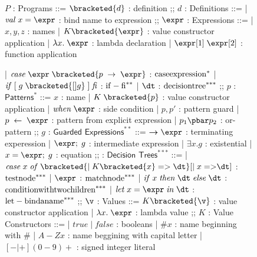\documentclass[manuscript,screen,review, 12pt]{acmart}
\begin{document}
\begin{figure}[h!p]
    \small
    \begin{flushleft}
        \begin{bnf}
        $P$ : \textsf{Programs} ::=
        $\bracketed{d}$ : definition
        ;;
        $d$ : \textsf{Definitions} ::=
        | $\mathit{val} \; x \; \mathit{=} \; \expr$ : bind name to expression
        ;;
        $\expr$ : Expressions ::= 
        | $x, y, z$              : names
        | $K\bracketed{\expr}$   : value constructor application 
        | $\lambda x. \; \expr$  : lambda declaration  
        | $\expr[1] \; \expr[2]$ : function application 
    
        | $\mathit{case} \; \expr \; \bracketed{p \; \rightarrow \; \expr}$ : $\rm{case expression}^{*}$
        | $\mathit{if} \; \mathit{[}\; g \; 
            \bracketed{[] g} \;\mathit{]} \; \mathit{fi}$                   : $\rm{if-fi}^{**}$
        | $\dt$ : $\rm{decision tree}^{***}$
            ;;
            $p$ : $\textsf{Patterns}^{*}$ ::= 
            $x$ : name 
            | $K \; \bracketed{p}$          : value constructor application 
            | $\mathit{when}\; \expr$       : side condition
            | $p, p'$                       : pattern guard 
            | $p \; \leftarrow \; \expr$    : pattern from explicit expression  
            | $p_{1}\pbar p_{2}$            : or-pattern
            ;;
            $g$ : $\textsf{Guarded Expressions}^{**}$ ::=  
            $\boldsymbol{\rightarrow}\expr$ : terminating experession
            | $\expr; \; g$                 : intermediate expression 
            | $\exists x \mathit{.} g$      : existential 
            | $x = \expr; \; g$             : equation 
            ;;
            \dt : $\textsf{Decision Trees}^{***}$ ::= 
            | $\mathit{case} \; x \; \mathit{of} \; 
                \bracketed{\vert \; K\bracketed{x} \; \mathit{=>} \; \dt} 
                [\vert \; x \; \mathit{=>} \dt]$                                 : $\rm{test node }^{***}$
            | $\expr$                                                           : $\rm{match node }^{***}$
            | $\mathit{if} \; x \; \mathit{then} \; \dt \; \mathit{else} \; \dt$  : $\rm{condition with two children }^{***}$
            | $\mathit{let} \; x \; \mathit{=} \; \expr \; \mathit{in} \; \dt$   : $\rm{let-bind a name}^{***}$
        ;;
        $\v$ : Values ::= 
          $K\bracketed{\v}$     : value constructor application 
        | $\lambda x. \; \expr$ : lambda value 
        ;;
        $K$ : \textsf{Value Constructors} ::=
        | $\mathit{true}\; \vert\; \mathit{false}$ : booleans
        | $\mathit{\#}x$                           : name beginning with $\mathit{\#}$
        | $\mathit{A-Z}x$                          : name beggining with capital letter
        | $[\mathit{-}\vert\mathit{+}]
            (\mathit{0}-\mathit{9})+$              : signed integer literal 
        \end{bnf}
        \medskip
        

\end{flushleft}
\end{figure}
\end{document}
